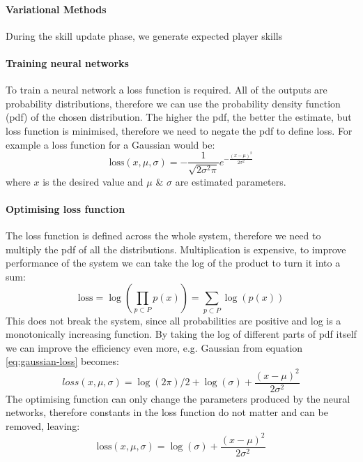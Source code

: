 \documentclass[12pt,a4paper]{book}
\begin{document}
\paragraph{Variational Methods}
During the skill update phase, we generate expected player skills 
\paragraph{Training neural networks}
To train a neural network a loss function is required.
All of the outputs are probability distributions, therefore we can use the probability density function (pdf) of the chosen distribution.
The higher the pdf, the better the estimate, but loss function is minimised, therefore we need to negate the pdf to define loss.
For example a loss function for a Gaussian would be:
\begin{equation}
\text{loss}(x,\mu,\sigma) = -\frac{1}{\sqrt{2\sigma^2\pi}}e^{-\frac{(x-\mu)^2}{2\sigma^2}}
\label{eq:gaussian-loss}
\end{equation}
where $x$ is the desired value and $\mu$ \& $\sigma$ are estimated parameters.

\paragraph{Optimising loss function}
The loss function is defined across the whole system, therefore we need to multiply the pdf of all the distributions.
Multiplication is expensive, to improve performance of the system we can take the log of the product to turn it into a sum:
\begin{equation}
\text{loss} = \log\left(\prod_{p\subset P}p(x)\right) = \sum_{p\subset P}\log(p(x))
\end{equation}
This does not break the system, since all probabilities are positive and log is a monotonically increasing function.
By taking the log of different parts of pdf itself we can improve the efficiency even more, e.g. Gaussian from equation \ref{eq:gaussian-loss} becomes:
\begin{equation}
{loss}(x,\mu,\sigma) = \log(2\pi)/2+\log(\sigma)+\frac{(x-\mu)^2}{2\sigma^2}
\end{equation}
The optimising function can only change the parameters produced by the neural networks, therefore constants in the loss function do not matter and can be removed, leaving:
\begin{equation}
\text{loss}(x,\mu,\sigma) = \log(\sigma)+\frac{(x-\mu)^2}{2\sigma^2}
\label{eq:gaussian-log-loss}
\end{equation}
\end{document}
